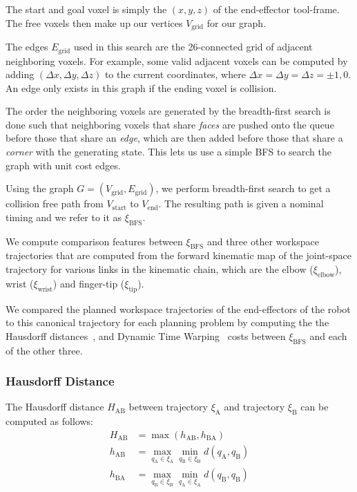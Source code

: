 \documentclass[letterpaper, 10 pt, conference]{ieeeconf}  %
\begin{document}
The start and goal voxel is simply the $(x,y,z)$ of the end-effector tool-frame. The free voxels then make up our vertices $V_\text{grid}$ for our graph.

The edges $E_\text{grid}$ used in this search are the 26-connected grid of adjacent neighboring voxels. For example, some valid adjacent voxels can be computed by adding $(\Delta x,\Delta y,\Delta z)$ to the current coordinates, where $\Delta x= \Delta y= \Delta z= {\pm1,0}$. An edge only exists in this graph if the ending voxel is collision.

The order the neighboring voxels are generated by the breadth-first search is done such that neighboring voxels that share \emph{faces} are pushed onto the queue before those that share an \emph{edge}, which are then added before those that share a \emph{corner} with the generating state. This lets us use a simple BFS to search the graph with unit cost edges.

Using the graph $G=(V_\text{grid}, E_\text{grid})$, we perform breadth-first search to get a collision free path from $V_\text{start}$ to $V_\text{end}$. The resulting path is given a nominal timing and we refer to it as $\xi_{\text{BFS}}$. 

We compute comparison features between $\xi_{\text{BFS}}$ and three other workspace trajectories that are computed from the forward kinematic map of the joint-space trajectory for various links in the kinematic chain, which are the elbow ($\xi_\text{elbow}$), wrist ($\xi_\text{wrist}$) and finger-tip ($\xi_\text{tip}$).

We compared the planned workspace trajectories of the end-effectors of the robot to this canonical trajectory for each planning problem by computing the the Hausdorff distances~\cite{dubuisson1994modified}, and Dynamic Time Warping~\cite{senin2008dynamic} costs between $\xi_{\text{BFS}}$ and each of the other three.

\subsubsection{Hausdorff Distance}

The Hausdorff distance $H_\text{AB}$ between trajectory $\xi_\text{A}$ and trajectory $\xi_\text{B}$ can be computed as follows:
\begin{equation}
\begin{aligned}
H_\text{AB} &= \max (h_{\text{AB}}, h_{\text{BA}}) \\
h_{\text{AB}} &= \max_{q_\text{A} \in \xi_\text{A}} \min_{q_\text{B} \in \xi_\text{B}} d(q_\text{A}, q_\text{B})\\
h_{\text{BA}} &= \max_{q_\text{B} \in \xi_\text{B}} \min_{q_\text{A} \in \xi_\text{A}} d(q_\text{B}, q_\text{B})\\
\end{aligned}
\end{equation}
\end{document}
